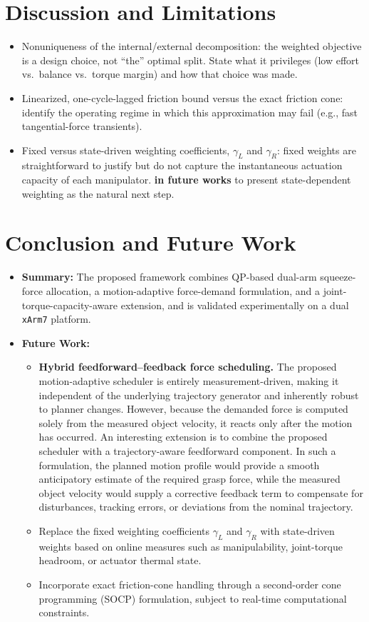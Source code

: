 \documentclass[conference]{IEEEtran}
\begin{document}
\section{Discussion and Limitations}
\begin{itemize}
    \item Nonuniqueness of the internal/external decomposition: the weighted objective is a design choice, not ``the'' optimal split. State what it privileges (low effort vs.\ balance vs.\ torque margin) and how that choice was made.
    \item Linearized, one-cycle-lagged friction bound versus the exact friction cone: identify the operating regime in which this approximation may fail (e.g., fast tangential-force transients).
    \item Fixed versus state-driven weighting coefficients, \(\gamma_L\) and \(\gamma_R\): fixed weights are straightforward to justify but do not capture the instantaneous actuation capacity of each manipulator. \textbf{in future works} to present state-dependent weighting as the natural next step.
\end{itemize}
\section{Conclusion and Future Work}
\begin{itemize}
    \item \textbf{Summary:} The proposed framework combines QP-based dual-arm squeeze-force allocation, a motion-adaptive force-demand formulation, and a joint-torque-capacity-aware extension, and is validated experimentally on a dual \texttt{xArm7} platform.

    \item \textbf{Future Work:}
    \begin{itemize}
        \item \textbf{Hybrid feedforward--feedback force scheduling.} The proposed motion-adaptive scheduler is entirely measurement-driven, making it independent of the underlying trajectory generator and inherently robust to planner changes. However, because the demanded force is computed solely from the measured object velocity, it reacts only after the motion has occurred. An interesting extension is to combine the proposed scheduler with a trajectory-aware feedforward component. In such a formulation, the planned motion profile would provide a smooth anticipatory estimate of the required grasp force, while the measured object velocity would supply a corrective feedback term to compensate for disturbances, tracking errors, or deviations from the nominal trajectory. 
        \item Replace the fixed weighting coefficients \(\gamma_L\) and \(\gamma_R\) with state-driven weights based on online measures such as manipulability, joint-torque headroom, or actuator thermal state.
        \item Incorporate exact friction-cone handling through a second-order cone programming (SOCP) formulation, subject to real-time computational constraints.
    \end{itemize}
\end{itemize}
\end{document}
